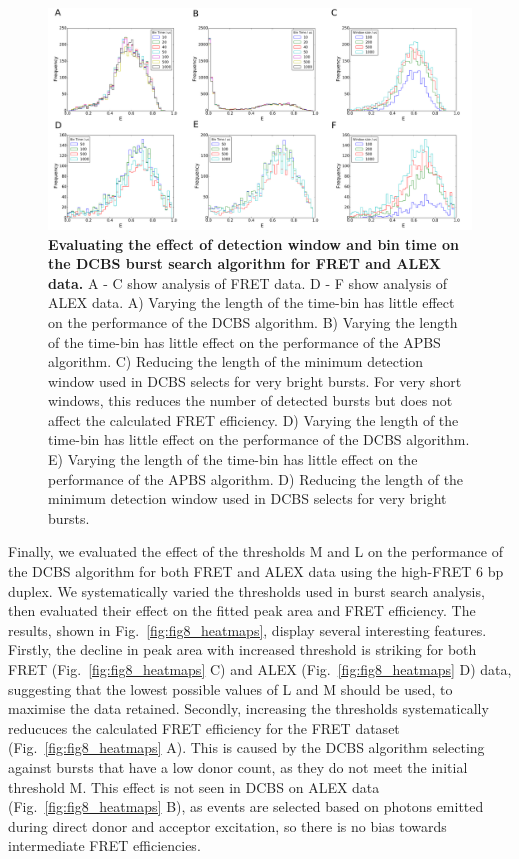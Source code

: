 \begin{figure}[!ht]
   \begin{center}
      \includegraphics*[clip=true, width=6in]{pyFRET/window_effect.pdf}
      \caption{{\bf Evaluating the effect of detection window and bin time on the DCBS burst search algorithm for FRET and ALEX data.} A - C show analysis of FRET data. D - F show analysis of ALEX data. A) Varying the length of the time-bin has little effect on the performance of the DCBS algorithm. B) Varying the length of the time-bin has little effect on the performance of the APBS algorithm. C) Reducing the length of the minimum detection window used in DCBS selects for very bright bursts. For very short windows, this reduces the number of detected bursts but does not affect the calculated FRET efficiency. D) Varying the length of the time-bin has little effect on the performance of the DCBS algorithm. E) Varying the length of the time-bin has little effect on the performance of the APBS algorithm. D) Reducing the length of the minimum detection window used in DCBS selects for very bright bursts.}
      \label{fig:fig7_binning}
   \end{center}
\end{figure}

Finally, we evaluated the effect of the thresholds M and L on the performance of the DCBS algorithm for both FRET and ALEX data using the high-FRET 6 bp duplex. We systematically varied the thresholds used in burst search analysis, then evaluated their effect on the fitted peak area and FRET efficiency. The results, shown in Fig.~\ref{fig:fig8_heatmaps}, display several interesting features. Firstly, the decline in peak area with increased threshold is striking for both FRET (Fig.~\ref{fig:fig8_heatmaps} C) and ALEX (Fig.~\ref{fig:fig8_heatmaps} D) data, suggesting that the lowest possible values of L and M should be used, to maximise the data retained. Secondly, increasing the thresholds systematically reducuces the calculated FRET efficiency for the FRET dataset (Fig.~\ref{fig:fig8_heatmaps} A). This is caused by the DCBS algorithm selecting against bursts that have a low donor count, as they do not meet the initial threshold M. This effect is not seen in DCBS on ALEX data (Fig.~\ref{fig:fig8_heatmaps} B), as events are selected based on photons emitted during direct donor and acceptor excitation, so there is no bias towards intermediate FRET efficiencies.

